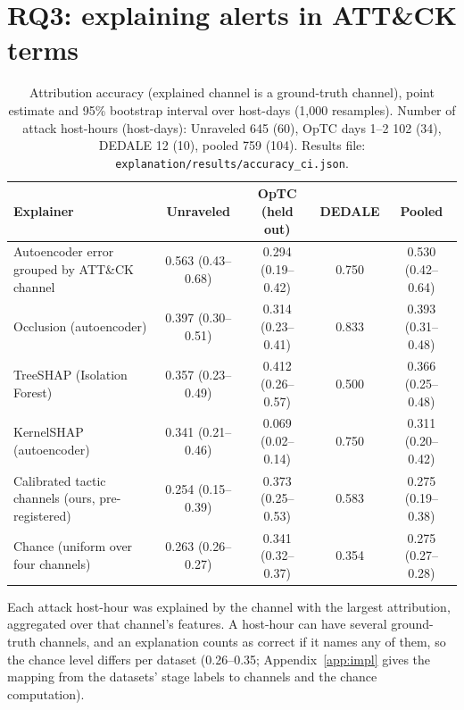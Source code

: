 \documentclass[acmlarge,screen,review]{acmart}
\begin{document}
\section{RQ3: explaining alerts in ATT\&CK terms}\label{sec:rq3}
\begin{table}[!htbp]
\centering\footnotesize
\caption{Attribution accuracy (explained channel is a ground-truth channel), point estimate and 95\% bootstrap
interval over host-days (1,000 resamples). Number of attack host-hours (host-days): Unraveled 645 (60), OpTC days 1--2
102 (34), DEDALE 12 (10), pooled 759 (104). Results file: \texttt{explanation/results/accuracy\_ci.json}.}
\label{tab:rq3}
\setlength{\tabcolsep}{3pt}\footnotesize
\begin{tabular}{@{}p{3.1cm}cccc@{}}
\toprule
Explainer & Unraveled & OpTC (held out) & DEDALE & Pooled \\
\midrule
Autoencoder error grouped by ATT\&CK channel & 0.563 (0.43--0.68) & 0.294 (0.19--0.42) & 0.750 & 0.530 (0.42--0.64) \\
Occlusion (autoencoder) & 0.397 (0.30--0.51) & 0.314 (0.23--0.41) & 0.833 & 0.393 (0.31--0.48) \\
TreeSHAP (Isolation Forest) & 0.357 (0.23--0.49) & 0.412 (0.26--0.57) & 0.500 & 0.366 (0.25--0.48) \\
KernelSHAP (autoencoder) & 0.341 (0.21--0.46) & 0.069 (0.02--0.14) & 0.750 & 0.311 (0.20--0.42) \\
Calibrated tactic channels (ours, pre-registered) & 0.254 (0.15--0.39) & 0.373 (0.25--0.53) & 0.583 & 0.275 (0.19--0.38) \\
Chance (uniform over four channels) & 0.263 (0.26--0.27) & 0.341 (0.32--0.37) & 0.354 & 0.275 (0.27--0.28) \\
\bottomrule
\end{tabular}
\end{table}
Each attack host-hour was explained by the channel with the largest attribution, aggregated over that channel's
features. A host-hour can have several ground-truth channels, and an explanation counts as correct if it names any of
them, so the chance level differs per dataset (0.26--0.35; Appendix~\ref{app:impl} gives the mapping from the
datasets' stage labels to channels and the chance computation).
\end{document}
